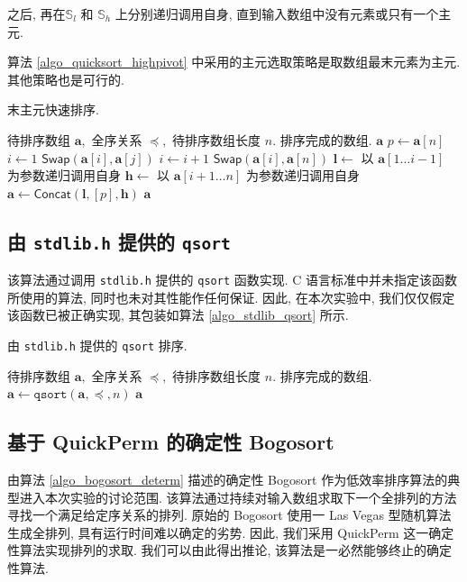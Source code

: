 \documentclass[12pt]{article}
\begin{document}
之后, 再在$\mathbb{S}_l$ 和 $\mathbb{S}_h$ 上分别递归调用自身, 直到输入数组中没有元素或只有一个主元.

算法 \ref{algo_quicksort_highpivot} 中采用的主元选取策略是取数组最末元素为主元. 其他策略也是可行的.

\begin{algorithm}
\caption{末主元快速排序.}
\label{algo_quicksort_highpivot}
\begin{algorithmic}[1]
\Require 待排序数组 $\bm{a},$ 全序关系 $\preceq,$ 待排序数组长度 $n.$
\Ensure 排序完成的数组.
    \State \Return $\bm{a}$
\EndIf
\State $p \gets \bm{a}[n]$
\State $i \gets 1$
        \State $\mathsf{Swap}(\bm{a}[i], \bm{a}[j])$
        \State $i \gets i + 1$
    \EndIf
\EndFor
\State $\mathsf{Swap}(\bm{a}[i], \bm{a}[n])$
\State $\bm{l} \gets$ 以 $\bm{a}[1 \dots i-1]$ 为参数递归调用自身
\State $\bm{h} \gets$ 以 $\bm{a}[i+1 \dots n]$ 为参数递归调用自身
\State $\bm{a} \gets \mathsf{Concat}(\bm{l}, [p], \bm{h})$
\State \Return $\bm{a}$
\end{algorithmic}
\end{algorithm}

\subsection{由 \texttt{stdlib.h} 提供的 \texttt{qsort}}

该算法通过调用 \texttt{stdlib.h} 提供的 \texttt{qsort} 函数实现. C 语言标准中并未指定该函数所使用的算法, 同时也未对其性能作任何保证. 因此, 在本次实验中, 我们仅仅假定该函数已被正确实现, 其包装如算法 \ref{algo_stdlib_qsort} 所示.

\begin{algorithm}
\caption{由 \texttt{stdlib.h} 提供的 \texttt{qsort} 排序.}
\label{algo_stdlib_qsort}
\begin{algorithmic}[1]
\Require 待排序数组 $\bm{a},$ 全序关系 $\preceq,$ 待排序数组长度 $n.$
\Ensure 排序完成的数组.
\State $\bm{a} \gets \mathtt{qsort}(\bm{a}, \preceq, n)$
\State \Return $\bm{a}$
\end{algorithmic}
\end{algorithm}

\subsection{基于 QuickPerm 的确定性 Bogosort}

由算法 \ref{algo_bogosort_determ} 描述的确定性 Bogosort 作为低效率排序算法的典型进入本次实验的讨论范围. 该算法通过持续对输入数组求取下一个全排列的方法寻找一个满足给定序关系的排列. 原始的 Bogosort 使用一 Las Vegas 型随机算法生成全排列, 具有运行时间难以确定的劣势. 因此, 我们采用 QuickPerm\cite{bib_quickperm} 这一确定性算法实现排列的求取. 我们可以由此得出推论, 该算法是一必然能够终止的确定性算法.
\end{document}
